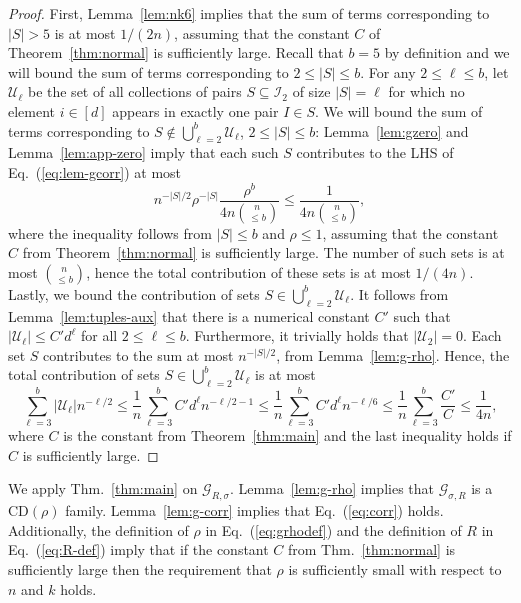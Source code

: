 \documentclass[final, 12pt]{colt2018}
\providecommand{\CD}{\mathrm{CD}}
\renewcommand{\eqref}[1]{Eq.~(\ref{#1})}
\newcommand{\lemref}[1]{Lemma~\ref{#1}}
\newcommand{\thmref}[1]{Thm.~\ref{#1}}
\begin{document}
\begin{proof}
First, Lemma~\ref{lem:nk6} implies that the sum of terms corresponding to $\lvert S \rvert > 5$ is at most $1/(2n)$, assuming that the constant $C$ of Theorem~\ref{thm:normal} is sufficiently large. Recall that $b = 5$ by definition and we will bound the sum of terms corresponding to $2 \le \lvert S \rvert \le b$.
For any $2 \le \ell \le b$, let $\mathcal{U}_\ell$ be the set of all collections of pairs $S \subseteq \mathcal{I}_2$ of size $\lvert S \rvert = \ell$ for which no element $i \in [d]$ appears in exactly one pair $I \in S$. We will bound the sum of terms corresponding to $S \notin \bigcup_{\ell=2}^b \mathcal{U}_\ell$, $2 \le \lvert S \rvert \le b$: Lemma~\ref{lem:gzero} and Lemma~\ref{lem:app-zero} imply that each such $S$ contributes to the LHS of \eqref{eq:lem-gcorr} at most
\[
n^{-\lvert S \rvert /2} \rho^{-\lvert S \rvert} \frac{\rho^{b}}{4n {\binom{n}{\le b}}}
\le \frac{1}{4n {\binom{n}{\le b}}},
\]
where the inequality follows from $\lvert S \rvert \le b$ and $\rho \le 1$, assuming that the constant $C$ from Theorem~\ref{thm:normal} is sufficiently large.
The number of such sets is at most $\binom{n}{\le b}$, hence the total contribution of these sets is at most $1/(4n)$. Lastly, we bound the contribution of sets $S \in \bigcup_{\ell=2}^b \mathcal{U}_\ell$. It follows from Lemma~\ref{lem:tuples-aux} that there is a numerical constant $C'$ such that $\lvert \mathcal{U}_\ell\rvert \le C' d^\ell$ for all $2 \le \ell \le b$. Furthermore, it trivially holds that $\lvert\mathcal{U}_2\rvert = 0$. Each set $S$ contributes to the sum at most $n^{-\lvert S \rvert / 2}$, from Lemma~\ref{lem:g-rho}. Hence, the total contribution of sets $S \in \bigcup_{\ell=2}^b \mathcal{U}_\ell$ is at most
\[
\sum_{\ell=3}^b \left\lvert \mathcal{U}_\ell\right\rvert n^{-\ell / 2}
\le \frac{1}{n} \sum_{\ell=3}^b C' d^\ell n^{-\ell/2 - 1}
\le \frac{1}{n} \sum_{\ell=3}^b C' d^\ell n^{-\ell/6}
\le \frac{1}{n} \sum_{\ell=3}^b \frac{C'}{C}
\le \frac{1}{4n},
\]
where $C$ is the constant from Theorem~\ref{thm:main} and the last inequality holds if $C$ is sufficiently large.
\end{proof}

We apply \thmref{thm:main} on $\mathcal{G}_{R,\sigma}$. \lemref{lem:g-rho} implies that $\mathcal{G}_{\sigma,R}$
is a $\CD(\rho)$ family. Lemma~\ref{lem:g-corr} implies that \eqref{eq:corr} holds. Additionally, the definition of $\rho$ in \eqref{eq:grhodef} and the definition of $R$ in \eqref{eq:R-def} imply that if the constant $C$ from \thmref{thm:normal} is sufficiently large then the requirement that $\rho$ is sufficiently small with respect to $n$ and $k$ holds.
\end{document}
